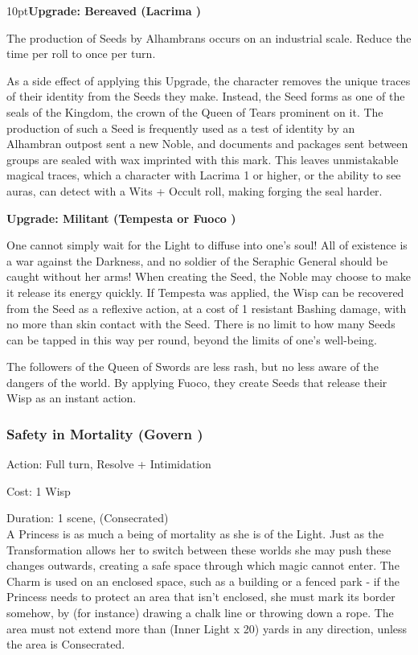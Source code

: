 \begin{myindentpar}{10pt}\textbf{Upgrade: Bereaved (Lacrima \textbullet\textbullet\textbullet)}

The production of Seeds by Alhambrans occurs on an industrial scale. Reduce the time per roll to once per turn. 

As a side effect of applying this Upgrade, the character removes the unique traces of their identity from the Seeds they make. Instead, the Seed forms as one of the seals of the Kingdom, the crown of the Queen of Tears prominent on it. The production of such a Seed is frequently used as a test of identity by an Alhambran outpost sent a new Noble, and documents and packages sent between groups are sealed with wax imprinted with this mark. This leaves unmistakable magical traces, which a character with Lacrima 1 or higher, or the ability to see auras, can detect with a Wits + Occult roll, making forging the seal harder.

\textbf{Upgrade: Militant (Tempesta \textbullet\textbullet or Fuoco \textbullet\textbullet\textbullet)}

One cannot simply wait for the Light to diffuse into one's soul! All of existence is a war against the Darkness, and no soldier of the Seraphic General should be caught without her arms! When creating the Seed, the Noble may choose to make it release its energy quickly. If Tempesta was applied, the Wisp can be recovered from the Seed as a reflexive action, at a cost of 1 resistant Bashing  damage, with no more than skin contact with the Seed. There is no limit to how many Seeds can be tapped in this way per round, beyond the limits of one's well-being.

The followers of the Queen of Swords are less rash, but no less aware of the dangers of the world. By applying Fuoco, they create Seeds that release their Wisp as an instant action.\end{myindentpar}

\subsubsection*{Safety in Mortality (Govern \textbullet\textbullet)}

\noindent Action: Full turn, Resolve + Intimidation

\noindent Cost: 1 Wisp

\noindent Duration: 1 scene, (Consecrated) \\

\noindent A Princess is as much a being of mortality as she is of the Light. Just as the Transformation allows her to switch between these worlds she may push these changes outwards, creating a safe space through which magic cannot enter. The Charm is used on an enclosed space, such as a building or a fenced park - if the Princess needs to protect an area that isn't enclosed, she must mark its border somehow, by (for instance) drawing a chalk line or throwing down a rope. The area must not extend more than (Inner Light x 20) yards in any direction, unless the area is Consecrated.

